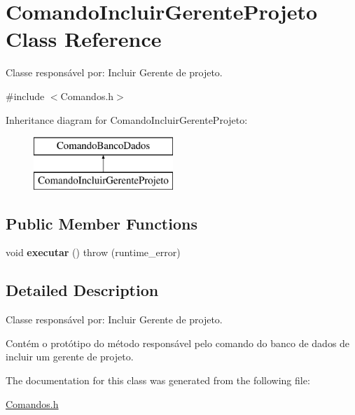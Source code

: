 \hypertarget{class_comando_incluir_gerente_projeto}{}\section{Comando\+Incluir\+Gerente\+Projeto Class Reference}
\label{class_comando_incluir_gerente_projeto}


Classe responsável por\+: Incluir Gerente de projeto.  




{\ttfamily \#include $<$Comandos.\+h$>$}

Inheritance diagram for Comando\+Incluir\+Gerente\+Projeto\+:\begin{figure}[H]
\begin{center}
\leavevmode
\includegraphics[height=2.000000cm]{class_comando_incluir_gerente_projeto}
\end{center}
\end{figure}
\subsection*{Public Member Functions}
\begin{DoxyCompactItemize}
\item 
\hypertarget{class_comando_incluir_gerente_projeto_aa2335f5e8292f9d9a0aa0344cecb72d9}{}\label{class_comando_incluir_gerente_projeto_aa2335f5e8292f9d9a0aa0344cecb72d9} 
void {\bfseries executar} ()  throw (runtime\+\_\+error)
\end{DoxyCompactItemize}


\subsection{Detailed Description}
Classe responsável por\+: Incluir Gerente de projeto. 

Contém o protótipo do método responsável pelo comando do banco de dados de incluir um gerente de projeto. 

The documentation for this class was generated from the following file\+:\begin{DoxyCompactItemize}
\item 
\hyperlink{_comandos_8h}{Comandos.\+h}\end{DoxyCompactItemize}
